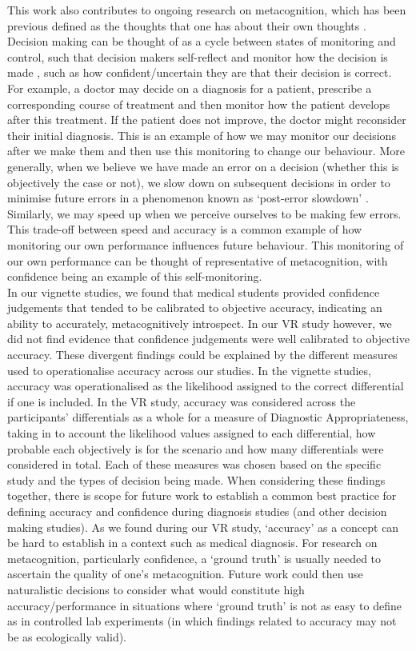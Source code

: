\documentclass[a4paper, nobind]{templates/ociamthesis}
\begin{document}
This work also contributes to ongoing research on metacognition, which has been previous defined as the thoughts that one has about their own thoughts \autocite{flavell_metacognition_1979}. Decision making can be thought of as a cycle between states of monitoring and control, such that decision makers self-reflect and monitor how the decision is made \autocite{nelson1990}, such as how confident/uncertain they are that their decision is correct. For example, a doctor may decide on a diagnosis for a patient, prescribe a corresponding course of treatment and then monitor how the patient develops after this treatment. If the patient does not improve, the doctor might reconsider their initial diagnosis. This is an example of how we may monitor our decisions after we make them and then use this monitoring to change our behaviour. More generally, when we believe we have made an error on a decision (whether this is objectively the case or not), we slow down on subsequent decisions in order to minimise future errors in a phenomenon known as `post-error slowdown' \autocite{rabbitt_three_1968}. Similarly, we may speed up when we perceive ourselves to be making few errors. This trade-off between speed and accuracy is a common example of how monitoring our own performance influences future behaviour. This monitoring of our own performance can be thought of representative of metacognition, with confidence being an example of this self-monitoring.\\

In our vignette studies, we found that medical students provided confidence judgements that tended to be calibrated to objective accuracy, indicating an ability to accurately, metacognitively introspect. In our VR study however, we did not find evidence that confidence judgements were well calibrated to objective accuracy. These divergent findings could be explained by the different measures used to operationalise accuracy across our studies. In the vignette studies, accuracy was operationalised as the likelihood assigned to the correct differential if one is included. In the VR study, accuracy was considered across the participants' differentials as a whole for a measure of Diagnostic Appropriateness, taking in to account the likelihood values assigned to each differential, how probable each objectively is for the scenario and how many differentials were considered in total. Each of these measures was chosen based on the specific study and the types of decision being made. When considering these findings together, there is scope for future work to establish a common best practice for defining accuracy and confidence during diagnosis studies (and other decision making studies). As we found during our VR study, `accuracy' as a concept can be hard to establish in a context such as medical diagnosis. For research on metacognition, particularly confidence, a `ground truth' is usually needed to ascertain the quality of one's metacognition. Future work could then use naturalistic decisions to consider what would constitute high accuracy/performance in situations where `ground truth' is not as easy to define as in controlled lab experiments (in which findings related to accuracy may not be as ecologically valid).\\
\end{document}
